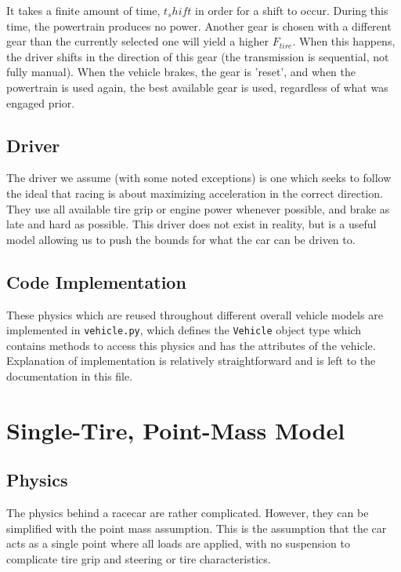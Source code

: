 \documentclass{article}
\begin{document}
It takes a finite amount of time, $t_shift$ in order for a shift to occur. During this time, the powertrain produces no power. Another gear is chosen with a different gear than the currently selected one will yield a higher $F_{tire}$. When this happens, the driver shifts in the direction of this gear (the transmission is sequential, not fully manual). When the vehicle brakes, the gear is 'reset', and when the powertrain is used again, the best available gear is used, regardless of what was engaged prior.


\subsection{Driver}

The driver we assume (with some noted exceptions) is one which seeks to follow the ideal that racing is about maximizing acceleration in the correct direction. They use all available tire grip or engine power whenever possible, and brake as late and hard as possible. This driver does not exist in reality, but is a useful model allowing us to push the bounds for what the car can be driven to.

\subsection{Code Implementation}
These physics which are reused throughout different overall vehicle models are implemented in \texttt{vehicle.py}, which defines the \texttt{Vehicle} object type which contains methods to access this physics and has the attributes of the vehicle. Explanation of implementation is relatively straightforward and is left to the documentation in this file.

\section{Single-Tire, Point-Mass Model}

\subsection{Physics}

The physics behind a racecar are rather complicated. However, they can be simplified with the point mass assumption. This is the assumption that the car acts as a single point where all loads are applied, with no suspension to complicate tire grip and steering or tire characteristics.
\end{document}
